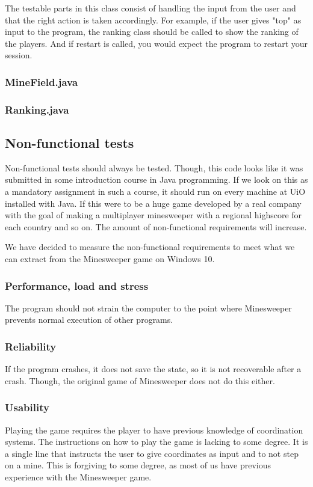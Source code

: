 \documentclass[UKenglish]{article}  %
\begin{document}
The testable parts in this class consist of handling the input from the user and that the right action is taken
accordingly. For example, if the user gives "top" as input to the program, the ranking class should be called to show
the ranking of the players. And if restart is called, you would expect the program to restart your session.

\subsubsection{MineField.java}

\subsubsection{Ranking.java}

\subsection{Non-functional tests}
Non-functional tests should always be tested. Though, this code looks like it was submitted in some introduction course
in Java programming. If we look on this as a mandatory assignment in such a course, it should run on every machine at
UiO installed with Java. If this were to be a huge game developed by a real company with the goal of making a
multiplayer minesweeper with a regional highscore for each country and so on. The amount of non-functional requirements
will increase. 

We have decided to measure the non-functional requirements to meet what we can extract from the Minesweeper game on
Windows 10.

\subsubsection{Performance, load and stress}
The program should not strain the computer to the point where Minesweeper prevents normal execution of other programs. 

\subsubsection{Reliability}
If the program crashes, it does not save the state, so it is not recoverable after a crash. Though, the original game of
Minesweeper does not do this either.

\subsubsection{Usability}
Playing the game requires the player to have previous knowledge of coordination systems. The instructions on how to play
the game is lacking to some degree. It is a single line that instructs the user to give coordinates as input and to not
step on a mine. This is forgiving to some degree, as most of us have previous experience with the Minesweeper game.
\end{document}
